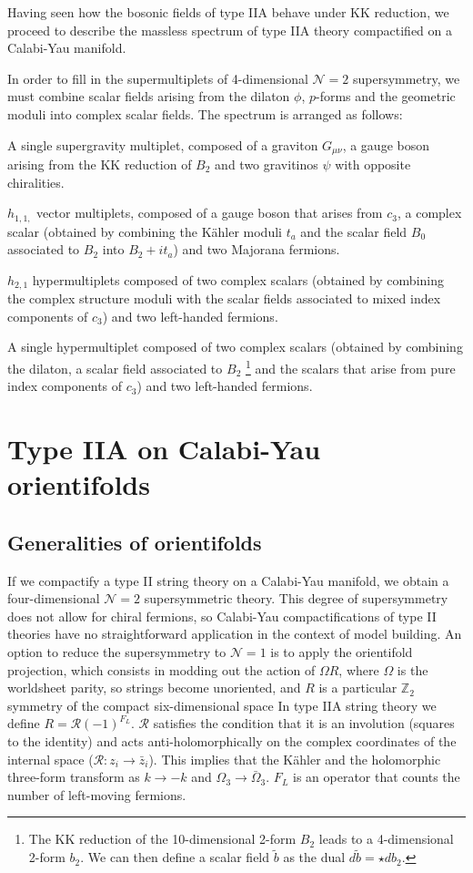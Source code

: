Having seen how the bosonic fields of type IIA behave under KK reduction, we proceed to describe the
massless spectrum of type IIA theory compactified on a Calabi-Yau manifold.

In order to fill in the supermultiplets of 4-dimensional $\mathcal N=2$ supersymmetry,
we must combine scalar fields arising from the dilaton $\phi$, $p$-forms and the geometric
moduli into complex scalar fields.
The spectrum is arranged as follows:

A single supergravity multiplet, composed of a graviton $G_{\mu\nu}$, a gauge boson arising from the KK reduction of $B_2$ and two gravitinos $\psi$ with opposite chiralities. 

$h_{1,1,}$ vector multiplets, composed of a gauge boson that arises from $c_3$, a complex scalar (obtained by combining the Kähler moduli $t_a$ and the scalar field $B_0$ associated to $B_2$ into $B_2+it_a$) and two Majorana fermions.

$h_{2,1}$ hypermultiplets composed of two complex scalars (obtained by combining the complex structure moduli with the scalar fields associated to mixed index components of $c_3$) and two left-handed fermions.

A single hypermultiplet composed of two complex scalars (obtained by combining the dilaton, a scalar field associated to $B_2$
\footnote{The KK reduction of the 10-dimensional 2-form $B_2$ leads to a 4-dimensional 2-form $b_2$.
We can then define a scalar field $\tilde b$ as the dual $d \tilde b = \star d b_2$.} and the scalars that arise from pure index components of $c_3$) and two left-handed fermions.

\section{Type IIA on Calabi-Yau orientifolds}

\subsection{Generalities of orientifolds}
If we compactify a type II string theory on a Calabi-Yau manifold, we  obtain a four-dimensional
$\mathcal N=2$ supersymmetric theory.
This degree of supersymmetry does not allow for chiral fermions, so Calabi-Yau compactifications
of type II theories have no straightforward application in the context of model building.
An option to reduce the supersymmetry to $\mathcal N=1$  is to apply the orientifold
projection, which consists in modding out the action of $\Omega R$,
where $\Omega$ is the worldsheet parity, so strings become unoriented, and
$R$ is a particular $\mathbb Z_2$ symmetry of the compact six-dimensional space
In type IIA string theory we define $R=\mathcal R (-1)^{F_L}$.
$\mathcal R$ satisfies the condition that it is an involution (squares to the identity) and 
acts anti-holomorphically on the complex coordinates of the internal space ($\mathcal R: z_i \to \bar z_i$).
This implies that the Kähler and the holomorphic three-form transform as $k\to -k$ and $\Omega_3 \to \bar \Omega_3$.
$F_L$ is an operator that counts the number of left-moving fermions.


